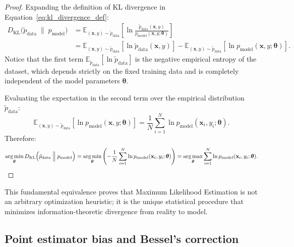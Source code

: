 \begin{proof}
Expanding the definition of KL divergence in Equation~\eqref{eq:kl_divergence_def}:
\begin{align}
D_{\text{KL}}\Big( \tilde{p}_{\text{data}} \;\Big\|\; p_{\text{model}} \Big) &= \mathbb{E}_{(\mathbf{x}, y) \sim \tilde{p}_{\text{data}}}\left[ \ln \frac{\tilde{p}_{\text{data}}(\mathbf{x}, y)}{p_{\text{model}}(\mathbf{x}, y; \boldsymbol{\theta})} \right] \nonumber \\
&= \mathbb{E}_{(\mathbf{x}, y) \sim \tilde{p}_{\text{data}}}\left[ \ln \tilde{p}_{\text{data}}(\mathbf{x}, y) \right] - \mathbb{E}_{(\mathbf{x}, y) \sim \tilde{p}_{\text{data}}}\left[ \ln p_{\text{model}}(\mathbf{x}, y; \boldsymbol{\theta}) \right].
\end{align}
Notice that the first term $\mathbb{E}_{\tilde{p}_{\text{data}}}[\ln \tilde{p}_{\text{data}}]$ is the negative empirical entropy of the dataset, which depends strictly on the fixed training data and is completely independent of the model parameters $\boldsymbol{\theta}$. 

Evaluating the expectation in the second term over the empirical distribution $\tilde{p}_{\text{data}}$:
\begin{equation}
\mathbb{E}_{(\mathbf{x}, y) \sim \tilde{p}_{\text{data}}}\left[ \ln p_{\text{model}}(\mathbf{x}, y; \boldsymbol{\theta}) \right] = \frac{1}{N} \sum_{i=1}^N \ln p_{\text{model}}(\mathbf{x}_i, y_i; \boldsymbol{\theta}).
\end{equation}
Therefore:
\begin{equation}
\operatorname*{arg\,min}_{\boldsymbol{\theta}} D_{\text{KL}}\Big( \tilde{p}_{\text{data}} \;\Big\|\; p_{\text{model}} \Big) = \operatorname*{arg\,min}_{\boldsymbol{\theta}} \left( -\frac{1}{N} \sum_{i=1}^N \ln p_{\text{model}}(\mathbf{x}_i, y_i; \boldsymbol{\theta}) \right) = \operatorname*{arg\,max}_{\boldsymbol{\theta}} \sum_{i=1}^N \ln p_{\text{model}}(\mathbf{x}_i, y_i; \boldsymbol{\theta}).
\end{equation}
\end{proof}
This fundamental equivalence proves that Maximum Likelihood Estimation is not an arbitrary optimization heuristic; it is the unique statistical procedure that minimizes information-theoretic divergence from reality to model.

\subsection{Point estimator bias and Bessel's correction}
\label{sec:point_estimators_and_bessel}

